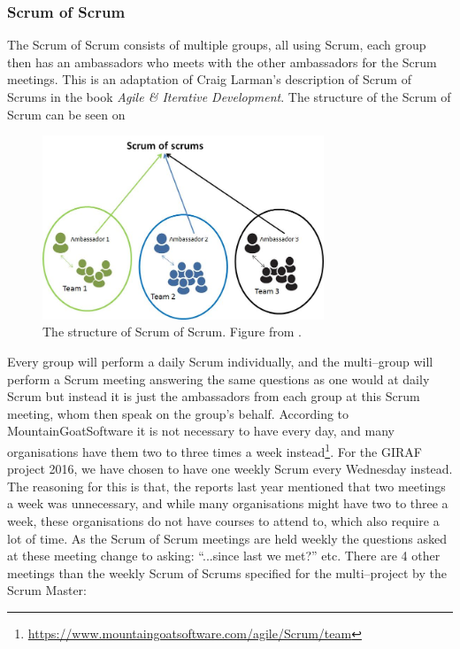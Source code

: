 \subsubsection{Scrum of Scrum}
The Scrum of Scrum consists of multiple groups, all using Scrum, each group then has an ambassadors who meets with the other ambassadors for the Scrum meetings.
This is an adaptation of Craig Larman's description of Scrum of Scrums in the book \textit{Agile \& Iterative Development}\cite{ScrumBOOK}.
The structure of the Scrum of Scrum can be seen on 

\begin{figure}[!htb]
\centering
\includegraphics[width=0.75\textwidth]{figures/ScrumofScrum.png}
\caption{The structure of Scrum of Scrum. Figure from \cite{ScrumofScrumfigure}.}
\label{fig:ScrumofScrum}
\end{figure}

Every group will perform a daily Scrum individually, and the multi--group will perform a Scrum meeting answering the same questions as one would at daily Scrum but instead it is just the ambassadors from each group at this Scrum meeting, whom then speak on the group's behalf.
According to MountainGoatSoftware it is not necessary to have every day, and many organisations have them two to three times a week instead\footnote{\url{https://www.mountaingoatsoftware.com/agile/Scrum/team}}.
For the GIRAF project 2016, we have chosen to have one weekly Scrum every Wednesday instead.
The reasoning for this is that, the reports last year mentioned that two meetings a week was unnecessary, and while many organisations might have two to three a week, these organisations do not have courses to attend to, which also require a lot of time.
As the Scrum of Scrum meetings are held weekly the questions asked at these meeting change to asking: \enquote{...since last we met?} etc.
There are 4 other meetings than the weekly Scrum of Scrums specified for the multi--project by the Scrum Master:

